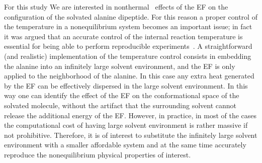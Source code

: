 \documentclass[a4paper,preprint,unsortedaddress,onecolumn]{revtex4-1}
\begin{document}
For this study We are interested in 
nonthermal~\cite{delaHoz2005microwaves} effects of the EF
on the configuration of the solvated alanine dipeptide.
For this reason a proper control of the temperature in a nonequilibrium system
becomes an important issue; in fact it was argued that  an
accurate control of the internal reaction temperature is essential for being able to
perform reproducible experiments~\cite{damm2012can}.
A straightforward (and realistic) implementation of the temperature control consists in 
embedding the alanine into an infinitely large solvent environment, and 
the EF is only applied to the neighborhood of the alanine. In this case
any extra heat generated by the EF can be effectively
dispersed in the large solvent environment.
In this way one can identify the effect of the EF on the conformational space of the solvated molecule,
without the artifact that the surrounding solvent cannot release the additional energy of the EF.
However, in practice, in most of the cases the computational cost of having large solvent environment is rather massive if not prohibitive.
Therefore, it is of interest to substitute the infinitely large
solvent environment with a smaller affordable system and at the same time accurately reproduce the nonequilibrium
physical properties of interest.
\end{document}
